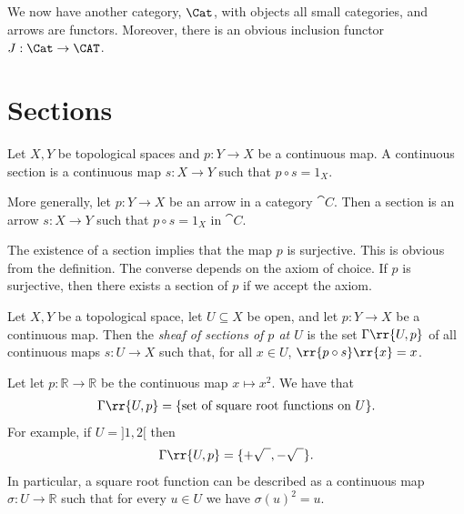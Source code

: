 \documentclass{article}
\begin{document}
\begin{example}
  We now have another category, $\Cat$, with objects all small categories, and
  arrows are functors. Moreover, there is an obvious inclusion functor
  $J:\Cat\to\CAT$.
\end{example}

\missingexample
{}

\section{Sections}\label{sec:sections}

\begin{definition}
  Let $X,Y$ be topological spaces and $p:Y\to X$ be a continuous map. A continuous section
  is a continuous map $s:X\to Y$ such that $p \circ s = 1_X$.

  More generally, let $p:Y\to X$ be an arrow in a category $\cat{C}$. Then a section
  is an arrow $s:X\to Y$ such that $p\circ s=1_X$ in $\cat{C}$.
\end{definition}

\begin{remark}
The existence of a section implies that the map $p$ is surjective. This is obvious from the definition.
The converse depends on the axiom of choice. If $p$ is surjective, then there exists a section of $p$ if we accept the axiom.
\end{remark}

\begin{definition}
  Let $X,Y$ be a topological space, let $U\subseteq X$ be open, and let $p:Y\to X$ be
  a continuous map. Then the \emph{sheaf of sections of $p$ at $U$} is the set
  $\Gamma\rr{U,p}$ of all continuous maps $s:U\to X$ such that, for all $x\in U$,
  $\rr{p\circ s}\rr{x}=x$.
\end{definition}

\begin{example}
Let let $p : \mathbb{R} \to \mathbb{R}$ be the continuous map $x \mapsto x^2$. We have that
\begin{align*}
	\Gamma\rr{U,p} = \{\text{set of square root functions on } U\}.
\end{align*}
For example, if $U = ]1, 2[$ then
\begin{align*}
	\Gamma\rr{U,p} = \{+\sqrt{\phantom{a}}, -\sqrt{\phantom{a}}\}.
\end{align*}
In particular, a square root function can be described as a continuous map $\sigma  : U \to \mathbb{R}$ such that for every  $u \in U$ we have $\sigma(u)^2 = u$.
\end{example}
\end{document}

